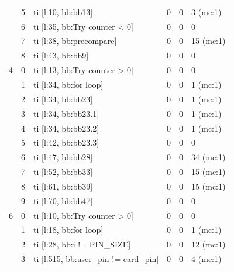\begin{table}[H]
{\begin{tabular}{l|l|l|l|l|l}
                    & 5  & ti [l:10, bb:bb13]                         & 0       & 0        & 3 (mc:1)   \\
                    & 6  & ti [l:35, bb:Try counter \textless{} 0]    & 0       & 0        & 0          \\
                    & 7  & ti [l:38, bb:precompare]                   & 0       & 0        & 15 (mc:1)  \\
                    & 8  & ti [l:43, bb:bb9]                          & 0       & 0        & 0          \\ 
            \midrule
            4       & 0  & ti [l:13, bb:Try counter \textgreater{} 0] & 0       & 0        & 0          \\
                    & 1  & ti [l:34, bb:for loop]                     & 0       & 0        & 1 (mc:1)   \\
                    & 2  & ti [l:34, bb:bb23]                         & 0       & 0        & 1 (mc:1)   \\
                    & 3  & ti [l:34, bb:bb23.1]                       & 0       & 0        & 1 (mc:1)   \\
                    & 4  & ti [l:34, bb:bb23.2]                       & 0       & 0        & 1 (mc:1)   \\
                    & 5  & ti [l:42, bb:bb23.3]                       & 0       & 0        & 0          \\
                    & 6  & ti [l:47, bb:bb28]                         & 0       & 0        & 34 (mc:1)  \\
                    & 7  & ti [l:52, bb:bb33]                         & 0       & 0        & 15 (mc:1)  \\
                    & 8  & ti [l:61, bb:bb39]                         & 0       & 0        & 15 (mc:1)  \\
                    & 9  & ti [l:70, bb:bb47]                         & 0       & 0        & 0          \\ 
            \midrule
            6       & 0  & ti [l:10, bb:Try counter \textgreater{} 0] & 0       & 0        & 0          \\
                    & 1  & ti [l:18, bb:for loop]                     & 0       & 0        & 1 (mc:1)   \\
                    & 2  & ti [l:28, bb:i != PIN\_SIZE]               & 0       & 0        & 12 (mc:1)  \\
                    & 3  & ti [l:515, bb:user\_pin != card\_pin]      & 0       & 0        & 4 (mc:1)   \\

\end{tabular}}
\end{table}
